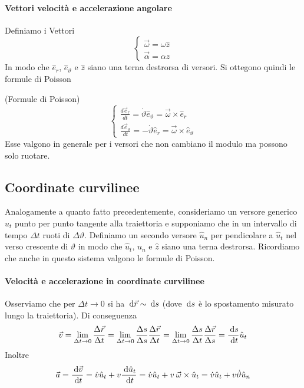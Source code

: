 \documentclass{article}
\theoremstyle{plain}
\begin{document}
\paragraph{Vettori velocità e accelerazione angolare}
Definiamo i Vettori
\[\begin{cases}
    \vec\omega = \omega \hat z\\
    \vec \alpha = \alpha \hat z
\end{cases}\]
In modo che $\hat e_r$, $\hat e_\vartheta$ e $\hat z$ siano una terna destrorsa di versori. Si ottegono quindi le formule di Poisson 
\begin{shadedTheorem}(Formule di Poisson)
    \[\renewcommand{\arraystretch}{2.5}
    \left\{\begin{array}{l}
    \frac{d\vec{e}_r}{dt}=\dot \vartheta \hat e_\vartheta=\vec\omega\times \hat e_r\\
    \frac{d\vec{e}_\vartheta}{dt}=-\dot \vartheta \hat e_r= \vec\omega\times \hat e_\vartheta
\end{array}\right.
\]
Esse valgono in generale per i versori che non cambiano il modulo ma possono solo ruotare.
\end{shadedTheorem}

\subsection{Coordinate curvilinee}
Analogamente a quanto fatto precedentemente, consideriamo un versore generico $\hat u_t$ punto per punto tangente alla traiettoria e supponiamo che in un intervallo di tempo $\Delta t$ ruoti di $\Delta \vartheta$. Definiamo un secondo versore $\hat u_n$ per pendicolare a $\hat u_t$ nel verso crescente di $\vartheta$ in modo che $\hat u_t$, $\hat u_n$ e $\hat z$ siano una terna destrorsa. Ricordiamo che anche in questo sistema valgono le formule di Poisson.

\paragraph{Velocità e accelerazione in coordinate curvilinee} Osserviamo che per $\Delta t\to 0$ si ha $\:\text{d}\vec r\sim \:\text{d}  s$ (dove $\:\text{d} s$ è lo spostamento misurato lungo la traiettoria). Di conseguenza
\[\vec v=\lim_{\Delta t\to 0}\frac{\Delta \vec r}{\Delta t}=\lim_{\Delta t\to 0}\frac{\Delta s}{\Delta s}\frac{\Delta \vec r}{\Delta t}=\lim_{\Delta t\to 0}\frac{\Delta s}{\Delta t}\frac{\Delta \vec r}{\Delta s}=\frac{\:\text{d} s}{\:\text{d} t}\hat u_t\]
Inoltre
\[\vec a= \frac{\:\text{d} \vec v}{\:\text{d} t}=\dot v \hat u_t+v\frac{\:\text{d} \hat u_t}{\:\text{d} t}=\dot v \hat u_t+v\:\vec \omega \times \hat u_t=\dot v \hat u_t+v \dot \vartheta \hat u_n\]
\end{document}
